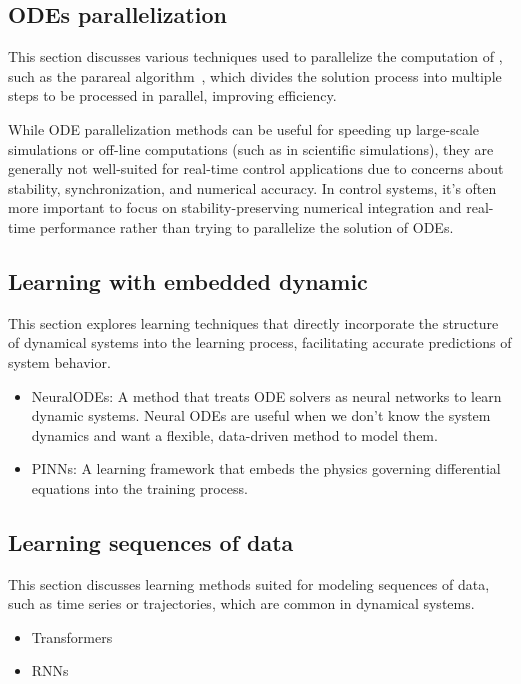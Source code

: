 \subsection{ODEs parallelization}

This section discusses various techniques used to parallelize the computation of , such as the parareal algorithm~\cite{cParareal}, which divides the solution process into multiple steps to be processed in parallel, improving efficiency.


While ODE parallelization methods can be useful for speeding up large-scale simulations or off-line computations (such as in scientific simulations), they are generally not well-suited for real-time control applications due to concerns about stability, synchronization, and numerical accuracy. In control systems, it's often more important to focus on stability-preserving numerical integration and real-time performance rather than trying to parallelize the solution of ODEs.


\subsection{Learning with embedded dynamic}

This section explores learning techniques that directly incorporate the structure of dynamical systems into the learning process, facilitating accurate predictions of system behavior.

\begin{itemize}
    \item NeuralODEs: A method that treats ODE solvers as neural networks to learn dynamic systems.
    Neural ODEs are useful when we don’t know the system dynamics and want a flexible, data-driven method to model them.
    \item PINNs: A learning framework that embeds the physics governing differential equations into the training process.
\end{itemize}

\subsection{Learning sequences of data}

This section discusses learning methods suited for modeling sequences of data, such as time series or trajectories, which are common in dynamical systems.

\begin{itemize}
    \item Transformers
    \item RNNs
\end{itemize}

